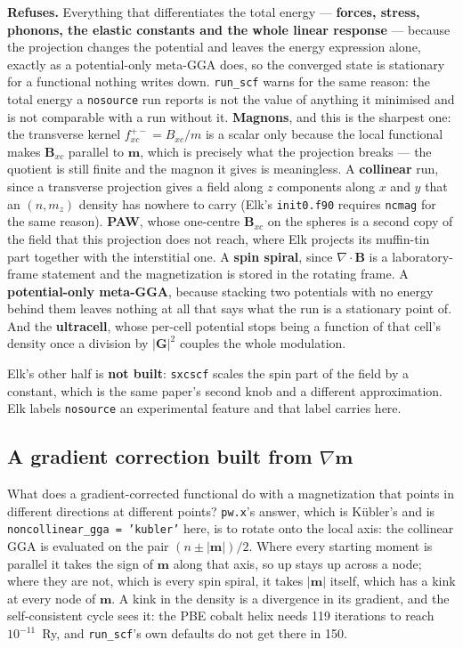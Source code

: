 \documentclass[11pt,a4paper]{article}
\newcommand{\code}[1]{\texttt{\small #1}}
\begin{document}
\begin{refuses}
\textbf{Refuses.} Everything that differentiates the total energy ---
\textbf{forces, stress, phonons, the elastic constants and the whole linear
response} --- because the projection changes the potential and leaves the energy
expression alone, exactly as a potential-only meta-GGA does, so the converged
state is stationary for a functional nothing writes down. \code{run\_scf} warns
for the same reason: the total energy a \code{nosource} run reports is not the
value of anything it minimised and is not comparable with a run without it.
\textbf{Magnons}, and this is the sharpest one: the transverse kernel
$f_{xc}^{+-} = B_{xc}/m$ is a scalar only because the local functional makes
$\mathbf B_{xc}$ parallel to $\mathbf m$, which is precisely what the projection
breaks --- the quotient is still finite and the magnon it gives is meaningless.
A \textbf{collinear} run, since a transverse projection gives a field along $z$
components along $x$ and $y$ that an $(n, m_z)$ density has nowhere to carry
(Elk's \code{init0.f90} requires \code{ncmag} for the same reason). \textbf{PAW},
whose one-centre $\mathbf B_{xc}$ on the spheres is a second copy of the field
that this projection does not reach, where Elk projects its muffin-tin part
together with the interstitial one. A \textbf{spin spiral}, since
$\nabla\cdot\mathbf B$ is a laboratory-frame statement and the magnetization is
stored in the rotating frame. A \textbf{potential-only meta-GGA}, because
stacking two potentials with no energy behind them leaves nothing at all that
says what the run is a stationary point of. And the \textbf{ultracell}, whose
per-cell potential stops being a function of that cell's density once a
division by $|\mathbf G|^2$ couples the whole modulation.

Elk's other half is \textbf{not built}: \code{sxcscf} scales the spin part of
the field by a constant, which is the same paper's second knob and a different
approximation. Elk labels \code{nosource} an experimental feature and that
label carries here.
\end{refuses}

\subsection{A gradient correction built from $\nabla\mathbf m$}

What does a gradient-corrected functional do with a magnetization that points in
different directions at different points? \code{pw.x}'s answer, which is
K\"ubler's and is \code{noncollinear\_gga = 'kubler'} here, is to rotate onto the local axis: the collinear
GGA is evaluated on the pair $(n\pm|\mathbf m|)/2$. Where every starting moment
is parallel it takes the sign of $\mathbf m$ along that axis, so up stays up
across a node; where they are not, which is every spin spiral, it takes
$|\mathbf m|$ itself, which has a kink at every node of $\mathbf m$. A kink in
the density is a divergence in its gradient, and the self-consistent cycle sees
it: the PBE cobalt helix needs 119 iterations to reach $10^{-11}$~Ry, and \code{run\_scf}'s
own defaults do not get there in 150.
\end{document}
